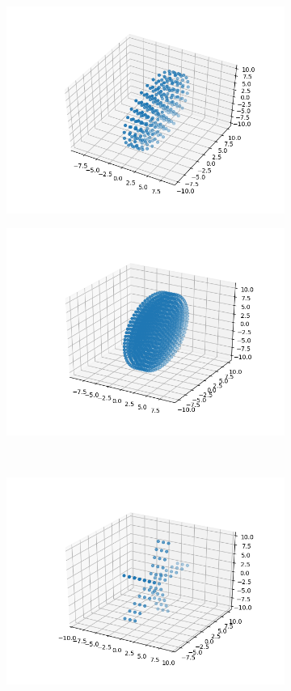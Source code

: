 \begin{figure}
\begin{subfigure}{.5\textwidth}
  \centering
  \includegraphics[width=.8\linewidth]{Zdjecia/5/pret1}
  \caption{}
  \label{fig:sfig1}
\end{subfigure}%
\begin{subfigure}{.5\textwidth}
  \centering
  \includegraphics[width=.8\linewidth]{Zdjecia/5/pret2}
  \caption{}
  \label{fig:sfig2}
\end{subfigure}\\
\begin{subfigure}{.5\textwidth}
  \centering
  \includegraphics[width=.8\linewidth]{Zdjecia/5/pret3}

\end{subfigure}
\end{figure}
